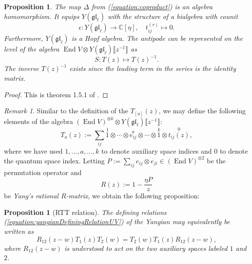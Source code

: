 \documentclass[11pt]{report}
\newtheorem{prop}[theorem]{Proposition}
\theoremstyle{definition}
\theoremstyle{remark}
\newtheorem*{remark}{Remark}
\theoremstyle{remark}
\newcommand{\End}{\operatorname{End}}
\newcommand{\C}{\mathbb{C}}
\begin{document}
\begin{prop}
The map $\Delta$ from (\ref{equation:coproduct}) is an algebra homomorphism. It equips $Y(\mathfrak{gl}_\ell)$ with the structure of a bialgebra with counit
\begin{equation*}
\epsilon: Y(\mathfrak{gl}_\ell) \to \C[\eta], \quad t_{ij}^{(r)} \mapsto 0.
\end{equation*}
Furthermore, $Y(\mathfrak{gl}_\ell)$ is a Hopf algebra. The antipode can be represented on the level of the algebra $\End V \otimes Y(\mathfrak{gl}_\ell)\llbracket z^{-1} \rrbracket$ as
\begin{equation*}
S: T(z) \mapsto T(z)^{-1}.
\end{equation*}
The inverse $T(z)^{-1}$ exists since the leading term in the series is the identity matrix.
\end{prop}

\begin{proof}
This is theorem 1.5.1 of \cite{book:molev}.
\end{proof}

\begin{remark}
Similar to the definition of the $T_{[a]}(z)$, we may define the following elements of the algebra $(\End V)^{\otimes k} \otimes Y(\mathfrak{gl}_\ell)\llbracket z^{-1} \rrbracket$:
\begin{equation*}
T_a(z) := \sum_{ij} \overset{1}{1} \otimes \cdots \otimes \overset{a}{e_{ij}} \otimes \cdots \otimes \overset{k}{1} \otimes \overset{0}{t_{ij}(z)},
\end{equation*}
where we have used $1,...,a,...,k$ to denote auxiliary space indices and $0$ to denote the quantum space index. Letting $P := \sum_{ij} e_{ij} \otimes e_{ji} \in (\End V)^{\otimes 2}$ be the permutation operator and
\begin{equation*}
R(z) := 1 - \frac{\eta P}{z}
\end{equation*}
be \emph{Yang's rational $R$-matrix}, we obtain the following proposition:
\end{remark}

\begin{prop}[RTT relation]
The defining relations (\ref{equation:yangianDefiningRelationUV}) of the Yangian may equivalently be written as
\begin{equation}\label{equation:RTTRelation}
R_{12}(z-w) T_1(z) T_2(w) = T_2(w) T_1(z) R_{12}(z-w),
\end{equation}
where $R_{12}(z-w)$ is understood to act on the two auxiliary spaces labeled $1$ and $2$.
\end{prop}
\end{document}
